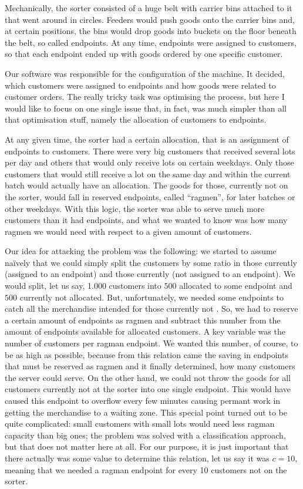 \documentclass{scrreprt}
\begin{document}
Mechanically, the sorter consisted
of a huge belt with 
carrier bins attached to it
that went around in circles.
Feeders would push goods onto the carrier bins
and, at certain positions,
the bins would drop goods into buckets
on the floor beneath the belt, so called endpoints.
At any time, endpoints were assigned
to customers, so that each endpoint
ended up with goods ordered by one specific customer.

Our software was responsible for the 
configuration of the machine.
It decided, which customers were assigned
to endpoints and how goods were related to customer orders.
The really tricky task was optimising the process,
but here I would like to focus on one single
issue that, in fact, was much simpler than all
that optimisation stuff, namely
the allocation of customers to endpoints.

At any given time, 
the sorter had a certain allocation,
that is an assignment of endpoints to customers.
There were very big customers
that received several lots per day and
others that would only receive lots on certain weekdays.
Only those customers that would still receive
a lot on the same day and within the current batch 
would actually have
an allocation. The goods for those, 
currently not on the sorter,
would fall in reserved endpoints, 
called ``ragmen'', for later batches
or other weekdays.
With this logic, the sorter was able to serve
much more customers than it had endpoints,
and what we wanted to know was
how many ragmen we would need
with respect to a given amount of customers. 

Our idea for attacking the problem was the following:
we started to assume na\"ively that we could
simply split the customers by some ratio 
in those currently  (assigned to an endpoint) and
those currently  (not assigned to an endpoint).
We would split, let us say, \num{1,000} customers 
into $500$ allocated to some endpoint
and $500$ currently not allocated.
But, unfortunately, we needed some endpoints
to catch all the merchandise intended
for those currently not .
So, we had to reserve a certain amount
of endpoints as ragmen
and subtract this number from the amount
of endpoints available for allocated customers.
A key variable was the number of customers 
per ragman endpoint.
We wanted this number, of course, to be as high
as possible, because from this relation 
came the saving in endpoints that must be reserved
as ragmen and it finally determined,
how many customers the server could serve.
On the other hand, we could not throw the goods
for all customers currently not at the sorter
into one single endpoint. This would have caused
this endpoint to overflow every few minutes
causing permant work in getting the merchandise
to a waiting zone.
This special point turned out to be quite complicated:
small customers with small lots would need
less ragman capacity than big ones; 
the problem was solved with
a classification approach,
but that does not matter here at all.
For our purpose, it is just important
that there actually was some value
to determine this relation, let us say
it was $c = 10$, meaning that we needed
a ragman endpoint for every 10 customers
not on the sorter.
\end{document}
